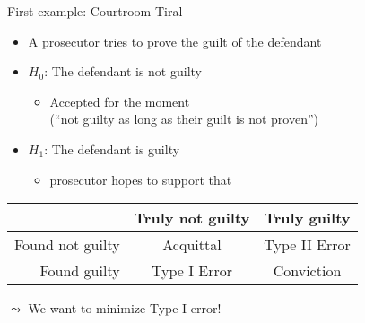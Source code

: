 	\begin{frame}[c]{First example: Courtroom Tiral}
		
		\begin{itemize}
			\item A prosecutor tries to prove the guilt of the defendant
			\item $H_0$: The defendant is not guilty
				\begin{itemize}
					\item Accepted for the moment\\ (``not guilty as long as their guilt is not proven'') 
				\end{itemize}
			\item $H_1$: The defendant is guilty
				\begin{itemize}
					\item prosecutor hopes to support that
				\end{itemize}
			\pause
		\end{itemize}
		
		\medskip
		\pause
		\bigskip
		\centering
		\begin{tabular}{r|cc}
			\toprule
			& Truly not guilty 	& Truly guilty\\
			\hline
			Found not guilty 	& Acquittal & Type II Error\\
			Found guilty & Type I Error		& Conviction\\
			\bottomrule
		\end{tabular}	
		
		\bigskip
		$\leadsto$ We want to minimize Type I error!
		
	\end{frame}
